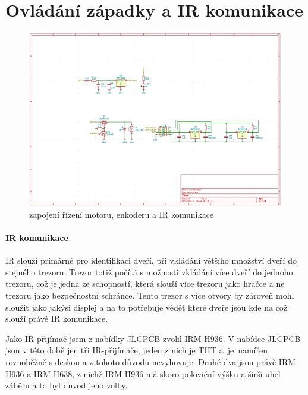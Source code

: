 \section{Ovládání západky a IR komunikace}

\begin{figure}[htbp]
    \centering
    \includegraphics[width=\textwidth]{kapitoly/obrazky/E4/ir_motor_enkoder/sch.png}
    \caption{zapojení řízení motoru, enkoderu a IR komunikace}
    \label{fig:E4-ir-motor-enkoder}
\end{figure}

\newpage

\paragraph{IR komunikace}
IR slouží primárně pro identifikaci dveří, při vkládání většího množství dveří do stejného trezoru.
Trezor totiž počítá s možností vkládání více dveří do jednoho trezoru, což je jedna ze schopností, která slouží více trezoru jako hračce a ne trezoru jako bezpečnostní schránce.
Tento trezor s více otvory by zároveň mohl sloužit jako jakýsi displej a na to potřebuje vědět které dveře jsou kde na což slouží právě IR komunikace.

Jako IR přijímač jsem z nabídky JLCPCB zvolil \href{https://datasheet.lcsc.com/szlcsc/1912111437_Everlight-Elec-IRM-H936-TR2_C264266.pdf}{IRM-H936}. V nabídce JLCPCB jsou v této době jen 
tři IR-přijímače, jeden z nich je THT a~je~namířen rovnoběžně s deskou a z tohoto důvodu nevyhovuje. Druhé dva jsou právě IRM-H936 a \href{https://datasheet.lcsc.com/szlcsc/2010221806_Everlight-Elec-IRM-H638T-TR2-DX_C390031.pdf}{IRM-H638},
z nichž IRM-H936 má skoro poloviční výšku a širší uhel záběru a to byl důvod jeho volby.

